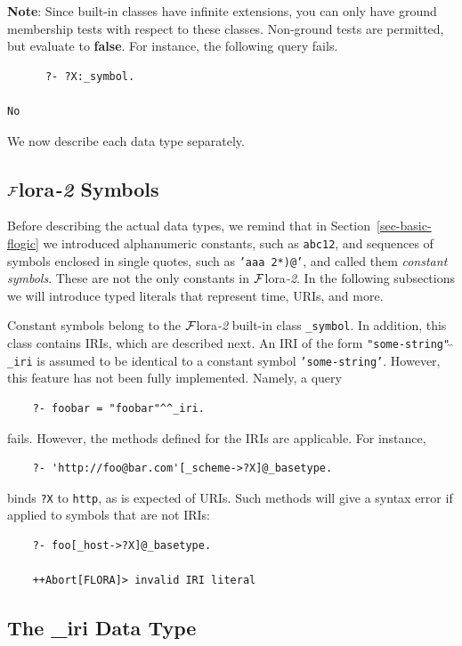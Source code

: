 \documentclass[11pt]{article}
\newcommand{\FLORA}{{\mbox{\sc ${\cal F}${lora}\rm\emph{-2}}}\xspace}
\begin{document}
{\bf Note}: Since built-in classes have infinite extensions, you can only have
ground membership tests with respect to these classes. Non-ground tests are
permitted, but evaluate to {\bf false}. For instance, the following
query fails.
\begin{verbatim}
      ?- ?X:_symbol.
 
No
\end{verbatim}

We now describe each data type separately.

\subsection{\FLORA Symbols}

Before describing the actual data types, we remind that
in Section~\ref{sec-basic-flogic} we introduced
alphanumeric constants, such as {\tt abc12}, and sequences of symbols
enclosed in single quotes, such as {\tt 'aaa 2*)@'},  and called them
\emph{constant symbols}. These are not the only constants in \FLORA.
In the following subsections we will introduce typed literals that
represent time, URIs, and more. 

Constant symbols belong to the \FLORA built-in class {\tt \_symbol}.
In addition, this class contains IRIs, which are described next.
An IRI of the form {\tt "some-string"$\hat{~}\hat{~}$\_iri} is assumed to
be identical to
a constant symbol {\tt 'some-string'}. However, this feature has not been
fully implemented. Namely, a query
\begin{verbatim}
    ?- foobar = "foobar"^^_iri.
\end{verbatim}
fails. However, the methods defined for the IRIs are applicable. For
instance,
\begin{verbatim}
    ?- 'http://foo@bar.com'[_scheme->?X]@_basetype.
\end{verbatim}
binds {\tt ?X} to {\tt http}, as is expected of URIs.
Such methods will give a syntax error if applied to symbols that are not
IRIs:
\begin{verbatim}
    ?- foo[_host->?X]@_basetype.

    ++Abort[FLORA]> invalid IRI literal
\end{verbatim}


\subsection{The \_iri Data Type}\label{sec-uri}
\end{document}
